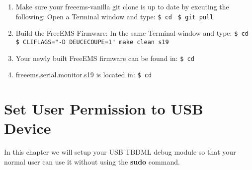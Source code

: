 \documentclass[12pt,notitlepage,onecolumn,oneside,openany]{memoir}
\begin{document}
\begin{enumerate}
\item \textsf{Make sure your freeems-vanilla git clone is up to date by excuting the following:} \newline
      \textsf{Open a Terminal window and type:} \newline
      \texttt{\$ cd }  \newline
      \texttt{\$ git pull}

\item \textsf{Build the FreeEMS Firmware:} \newline
      \textsf{In the same Terminal window and type:} \newline
      \texttt{\$ cd }  \newline
      \texttt{\$ CLIFLAGS="-D DEUCECOUPE=1" make clean s19}

\item \textsf{Your newly built FreeEMS firmware can be found in:} \newline
      \texttt{\$ cd } 

\item \textsf{freeems.serial.monitor.s19 is located in:} \newline
      \texttt{\$ cd } 
\end{enumerate}

\chapter{\textsf{Set User Permission to USB Device}}

\textsf{In this chapter we will setup your USB TBDML debug module so that your normal user can use it without using the \textbf{sudo} command.} \newline
\end{document}
